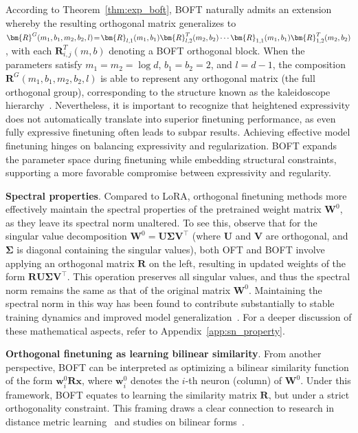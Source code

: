 According to Theorem~\ref{thm:exp_boft}, BOFT naturally admits an extension whereby the resulting orthogonal matrix generalizes to $\thickmuskip=2mu \medmuskip=2mu \bm{R}^G(m_1,b_1,m_2,b_2,l)=\bm{R}_{l,1}(m_1,b_1)\bm{R}_{l,2}^T(m_2,b_2)\cdots\bm{R}_{1,1}(m_1,b_1)\bm{R}_{1,2}^T(m_2,b_2)$, with each $\bm{R}_{i,j}^T(m,b)$ denoting a BOFT orthogonal block. When the parameters satisfy $m_1=m_2=\log d$, $b_1=b_2=2$, and $l=d-1$, the composition $\bm{R}^G(m_1,b_1,m_2,b_2,l)$ is able to represent any orthogonal matrix (the full orthogonal group), corresponding to the structure known as the kaleidoscope hierarchy~\cite{dao2019kaleidoscope}. Nevertheless, it is important to recognize that heightened expressivity does not automatically translate into superior finetuning performance, as even fully expressive finetuning often leads to subpar results. Achieving effective model finetuning hinges on balancing expressivity and regularization. BOFT expands the parameter space during finetuning while embedding structural constraints, supporting a more favorable compromise between expressivity and regularity.

\textbf{Spectral properties}. Compared to LoRA, orthogonal finetuning methods more effectively maintain the spectral properties of the pretrained weight matrix $\bm{W}^0$, as they leave its spectral norm unaltered. To see this, observe that for the singular value decomposition $\bm{W}^0 = \bm{U}\bm{\Sigma}\bm{V}^\top$ (where $\bm{U}$ and $\bm{V}$ are orthogonal, and $\bm{\Sigma}$ is diagonal containing the singular values), both OFT and BOFT involve applying an orthogonal matrix $\bm{R}$ on the left, resulting in updated weights of the form $\bm{R}\bm{U}\bm{\Sigma}\bm{V}^\top$. This operation preserves all singular values, and thus the spectral norm remains the same as that of the original matrix $\bm{W}^0$. Maintaining the spectral norm in this way has been found to contribute substantially to stable training dynamics and improved model generalization~\cite{miyato2018spectral,yoshida2017spectral}. For a deeper discussion of these mathematical aspects, refer to Appendix~\ref{app:sn_property}.

\textbf{Orthogonal finetuning as learning bilinear similarity}. From another perspective, BOFT can be interpreted as optimizing a bilinear similarity function of the form $\bm{w}^0_i\bm{R}\bm{x}$, where $\bm{w}^0_i$ denotes the $i$-th neuron (column) of $\bm{W}^0$. Under this framework, BOFT equates to learning the similarity matrix $\bm{R}$, but under a strict orthogonality constraint. This framing draws a clear connection to research in distance metric learning~\cite{xing2002distance} and studies on bilinear forms~\cite{roman2005advanced}.

